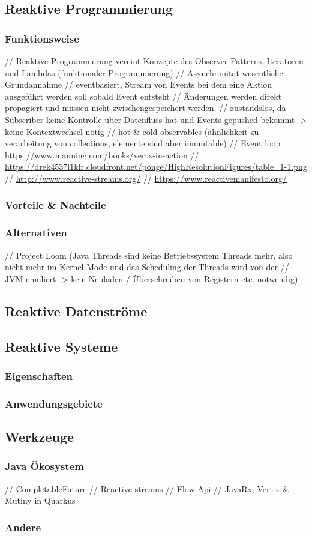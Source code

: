 \subsection{Reaktive Programmierung}
\label{section:reaktive_programmierung}
\subsubsection{Funktionsweise}
// Reaktive Programmierung vereint Konzepte des Observer Patterns, Iteratoren und Lambdas (funktionaler Programmierung)
// Asynchronität wesentliche Grundannahme
// eventbasiert, Stream von Events bei dem eine Aktion ausgeführt werden soll sobald Event entsteht
// Änderungen werden direkt propagiert und müssen nicht zwischengespeichert werden.
// zustandslos, da Subscriber keine Kontrolle über Datenfluss hat und Events gepushed bekommt -> keine Kontextwechsel nötig
// hot \& cold observables (ähnlichkeit zu verarbeitung von collections, elemente sind aber immutable)
// Event loop https://www.manning.com/books/vertx-in-action
// \url{https://drek4537l1klr.cloudfront.net/ponge/HighResolutionFigures/table_1-1.png}
// \url{http://www.reactive-streams.org/}
// \url{https://www.reactivemanifesto.org/}
\subsubsection{Vorteile \& Nachteile}

\subsubsection{Alternativen}
// Project Loom (Java Threads sind keine Betriebssystem Threads mehr, also nicht mehr im Kernel Mode und das Scheduling der Threads wird von der
// JVM emuliert -> kein Neuladen / Überschreiben von Registern etc. notwendig)
\subsection{Reaktive Datenströme}
\label{section.reaktive_datenströme}

\subsection{Reaktive Systeme}
\label{section:reaktive_systeme}

\subsubsection{Eigenschaften}

\subsubsection{Anwendungsgebiete}

\subsection{Werkzeuge}
\subsubsection{Java Ökosystem}
// CompletableFuture
// Reactive streams
// Flow Api
// JavaRx, Vert.x \& Mutiny in Quarkus
\subsubsection{Andere}